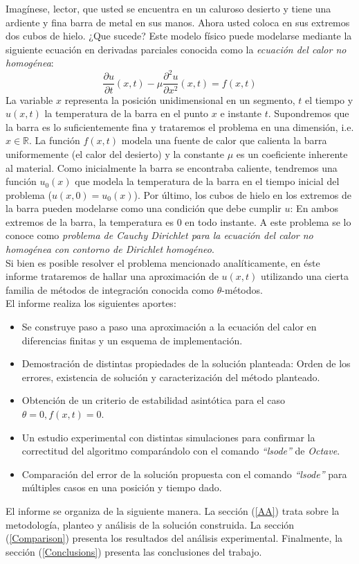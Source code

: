 \documentclass{endm}
\begin{document}
Imagínese, lector, que usted se encuentra en un caluroso desierto y tiene una ardiente y fina barra de metal en sus manos. Ahora usted coloca en sus extremos dos cubos de hielo. ¿Que sucede? Este modelo físico puede modelarse mediante la siguiente ecuación en derivadas parciales conocida como la \textit{ecuación del calor no homogénea}:
\begin{equation*}
    \frac{\partial u}{\partial t}(x,t) -\mu \frac{\partial^2 u}{\partial x^2}(x,t) = f(x,t)
\end{equation*}
La variable $x$ representa la posición unidimensional en un segmento, $t$ el tiempo y $u(x,t)$ la temperatura de la barra en el punto $x$ e instante $t$. Supondremos que la barra es lo suficientemente fina y trataremos el problema en una dimensión, i.e. $x \in \mathbb{R}$. La función $f(x,t)$ modela una fuente de calor que calienta la barra uniformemente (el calor del desierto) y la constante $\mu$ es un coeficiente inherente al material. Como inicialmente la barra se encontraba caliente, tendremos una función $u_0(x)$ que modela la temperatura de la barra en el tiempo inicial del problema ($u(x,0)=u_0(x)$). Por último, los cubos de hielo en los extremos de la barra pueden modelarse como una condición que debe cumplir $u$: En ambos extremos de la barra, la temperatura es $0$ en todo instante. A este problema se lo conoce como \textit{problema de Cauchy Dirichlet para la ecuación del calor no homogénea con contorno de Dirichlet homogéneo}.\\
Si bien es posible resolver el problema mencionado analíticamente, en éste informe trataremos de hallar una aproximación de $u(x,t)$ utilizando una cierta familia de métodos de integración conocida como $\theta$-métodos. \\
El informe realiza los siguientes aportes:
\begin{itemize}
    \item Se construye paso a paso una aproximación a la ecuación del calor en diferencias finitas y un esquema de implementación.
    \item Demostración de distintas propiedades de la solución planteada: Orden de los errores, existencia de solución y caracterización del método planteado.
    \item Obtención de un criterio de estabilidad asintótica para el caso $\theta=0,f(x,t)=0$.
    \item Un estudio experimental con distintas simulaciones para confirmar la correctitud del algoritmo comparándolo con el comando \textit{“lsode”} de \textit{Octave}.
    \item Comparación del error de la solución propuesta con el comando \textit{“lsode”} para múltiples casos en una posición y tiempo dado.
\end{itemize}
El informe se organiza de la siguiente manera. La sección (\ref{AA}) trata sobre la metodología, planteo y análisis de la solución construida. La sección (\ref{Comparison}) presenta los resultados del análisis experimental. Finalmente, la sección (\ref{Conclusions}) presenta las conclusiones del trabajo.
\end{document}
